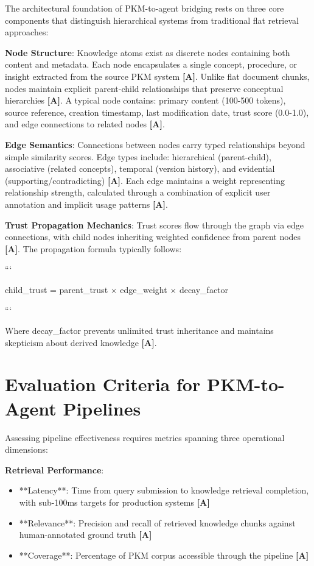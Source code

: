 \documentclass[a4paper,11pt]{article}
\newcommand{\alabel}{\textbf{\textcolor{acolor}{[A]}}}
\begin{document}
The architectural foundation of PKM-to-agent bridging rests on three core components that distinguish hierarchical systems from traditional flat retrieval approaches:


\textbf{Node Structure}: Knowledge atoms exist as discrete nodes containing both content and metadata. Each node encapsulates a single concept, procedure, or insight extracted from the source PKM system \alabel{}. Unlike flat document chunks, nodes maintain explicit parent-child relationships that preserve conceptual hierarchies \alabel{}. A typical node contains: primary content (100-500 tokens), source reference, creation timestamp, last modification date, trust score (0.0-1.0), and edge connections to related nodes \alabel{}.


\textbf{Edge Semantics}: Connections between nodes carry typed relationships beyond simple similarity scores. Edge types include: hierarchical (parent-child), associative (related concepts), temporal (version history), and evidential (supporting/contradicting) \alabel{}. Each edge maintains a weight representing relationship strength, calculated through a combination of explicit user annotation and implicit usage patterns \alabel{}.


\textbf{Trust Propagation Mechanics}: Trust scores flow through the graph via edge connections, with child nodes inheriting weighted confidence from parent nodes \alabel{}. The propagation formula typically follows:


```

child\_trust = parent\_trust × edge\_weight × decay\_factor

```


Where decay\_factor prevents unlimited trust inheritance and maintains skepticism about derived knowledge \alabel{}.


\section{Evaluation Criteria for PKM-to-Agent Pipelines}

Assessing pipeline effectiveness requires metrics spanning three operational dimensions:


\textbf{Retrieval Performance}:

\begin{itemize}
  \item **Latency**: Time from query submission to knowledge retrieval completion, with sub-100ms targets for production systems \alabel{}
  \item **Relevance**: Precision and recall of retrieved knowledge chunks against human-annotated ground truth \alabel{}
  \item **Coverage**: Percentage of PKM corpus accessible through the pipeline \alabel{}
\end{itemize}
\end{document}
